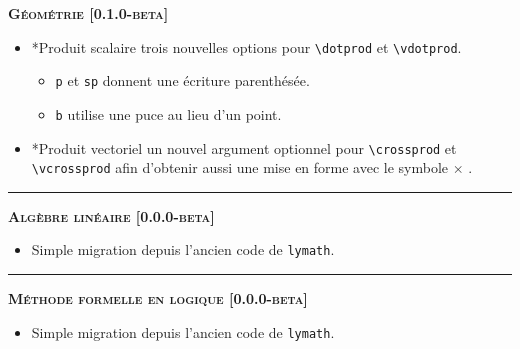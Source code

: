 \documentclass[12pt,a4paper]{book}
\makeatletter
\newcommand\env[1]{\texttt{#1}}
\newcommand\macro[1]{\env{\textbackslash{}#1}}
\theoremstyle{definition}
\newcommand\separation{
	\medskip
	\hfill\rule{0.5\textwidth}{0.75pt}\hfill
	\medskip
}
\newcommand\topic{\@ifstar{\@topic@star}{\@topic@no@star}}
\newcommand\@topic@no@star[1]{%
	\textbf{\textsc{#1}.}%
}
\newcommand\@topic@star[1]{%
	\textbf{\textsc{#1} :}%
}
\makeatother
\begin{document}
{{\begin{description}
    
    \begin{center}
        \textbf{\textsc{Géométrie [0.1.0-beta]}}
    \end{center}
    
    \begin{itemize}[itemsep=.5em]
        \item \topic*{Produit scalaire}
              trois nouvelles options pour \macro{dotprod} et \macro{vdotprod}.
        \begin{itemize}[itemsep=.5em]
            \item \verb+p+ et \verb+sp+ donnent une écriture parenthésée.
    
            \item \verb+b+ utilise une puce au lieu d'un point.
        \end{itemize}
    
    
    	
    
    
        \item \topic*{Produit vectoriel}
              un nouvel argument optionnel pour \macro{crossprod} et \macro{vcrossprod} afin d'obtenir aussi une mise en forme avec le symbole $\times$ .
    
    
        
    \end{itemize}
    
    
    \separation
    
    
    
    
    \begin{center}
        \textbf{\textsc{Algèbre linéaire [0.0.0-beta]}}
    \end{center}
    
    \begin{itemize}[itemsep=.5em]
        \item Simple migration depuis l'ancien code de \verb+lymath+.
    \end{itemize}
    
    
    \separation
    
    
    
    
    \begin{center}
        \textbf{\textsc{Méthode formelle en logique [0.0.0-beta]}}
    \end{center}
    
    \begin{itemize}[itemsep=.5em]
        \item Simple migration depuis l'ancien code de \verb+lymath+.
    \end{itemize}
    

\end{description}}}
\end{document}
